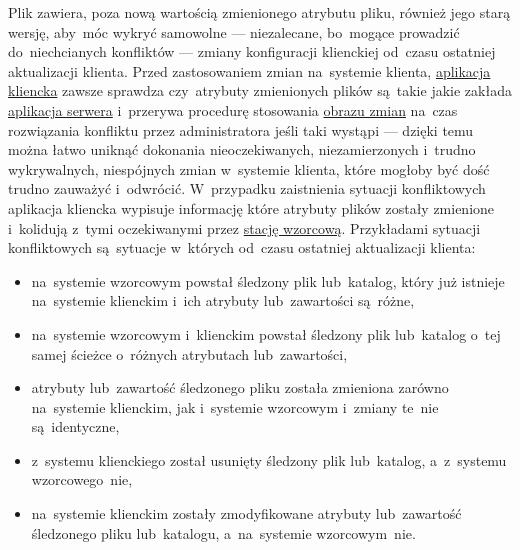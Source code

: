 \documentclass[thesis]{subfiles}
\begin{document}
\begin{itemize}
\end{itemize}

Plik  zawiera, poza nową wartością zmienionego atrybutu pliku, również jego starą wersję, aby~móc wykryć samowolne --- niezalecane, bo~mogące prowadzić do~niechcianych konfliktów --- zmiany konfiguracji klienckiej od~czasu ostatniej aktualizacji klienta. Przed zastosowaniem zmian na~systemie klienta, \hyperref[sec:cli-app]{aplikacja kliencka} zawsze sprawdza czy~atrybuty zmienionych plików są~takie jakie zakłada \hyperref[sec:srv-app]{aplikacja serwera} i~przerywa procedurę stosowania \hyperref[sec:obraz-zmian-konfiguracji]{obrazu zmian} na~czas rozwiązania konfliktu przez administratora jeśli taki wystąpi --- dzięki temu można łatwo uniknąć dokonania nieoczekiwanych, niezamierzonych i~trudno wykrywalnych, niespójnych zmian w~systemie klienta, które mogłoby być dość trudno zauważyć i~odwrócić. W~przypadku zaistnienia sytuacji konfliktowych aplikacja kliencka wypisuje informację które atrybuty plików zostały zmienione i~kolidują z~tymi oczekiwanymi przez \hyperref[sec:srv-app]{stację wzorcową}. Przykładami sytuacji konfliktowych są~sytuacje w~których od~czasu ostatniej aktualizacji klienta:\mynobreakpar
\begin{itemize}
	\item na~systemie wzorcowym powstał śledzony plik lub~katalog, który już istnieje na~systemie klienckim i~ich atrybuty lub~zawartości są~różne,
	\item na~systemie wzorcowym i~klienckim powstał śledzony plik lub~katalog o~tej samej ścieżce o~różnych atrybutach lub~zawartości,
	\item atrybuty lub~zawartość śledzonego pliku została zmieniona zarówno na~systemie klienckim, jak i~systemie wzorcowym i~zmiany te~nie są~identyczne,
	\item z~systemu klienckiego został usunięty śledzony plik lub~katalog, a~z~systemu wzorcowego~nie,
	\item na~systemie klienckim zostały zmodyfikowane atrybuty lub~zawartość śledzonego pliku lub~katalogu, a~na~systemie wzorcowym~nie.
\end{itemize}
\end{document}
